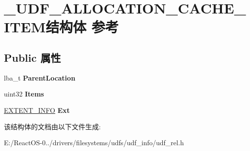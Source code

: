 \hypertarget{struct___u_d_f___a_l_l_o_c_a_t_i_o_n___c_a_c_h_e___i_t_e_m}{}\section{\+\_\+\+U\+D\+F\+\_\+\+A\+L\+L\+O\+C\+A\+T\+I\+O\+N\+\_\+\+C\+A\+C\+H\+E\+\_\+\+I\+T\+E\+M结构体 参考}
\label{struct___u_d_f___a_l_l_o_c_a_t_i_o_n___c_a_c_h_e___i_t_e_m}
\subsection*{Public 属性}
\begin{DoxyCompactItemize}
\item 
\mbox{\label{struct___u_d_f___a_l_l_o_c_a_t_i_o_n___c_a_c_h_e___i_t_e_m_a4495f6d1b866b12e1475f954c98ec773}} 
lba\+\_\+t {\bfseries Parent\+Location}
\item 
\mbox{\label{struct___u_d_f___a_l_l_o_c_a_t_i_o_n___c_a_c_h_e___i_t_e_m_ae42b355fb9b0abb540d881e6801d6134}} 
uint32 {\bfseries Items}
\item 
\mbox{\label{struct___u_d_f___a_l_l_o_c_a_t_i_o_n___c_a_c_h_e___i_t_e_m_a82f16d012f0e01442853c8490b9b599d}} 
\hyperlink{struct___e_x_t_e_n_t___i_n_f_o}{E\+X\+T\+E\+N\+T\+\_\+\+I\+N\+FO} {\bfseries Ext}
\end{DoxyCompactItemize}


该结构体的文档由以下文件生成\+:\begin{DoxyCompactItemize}
\item 
E\+:/\+React\+O\+S-\/0../drivers/filesystems/udfs/udf\+\_\+info/udf\+\_\+rel.\+h\end{DoxyCompactItemize}

